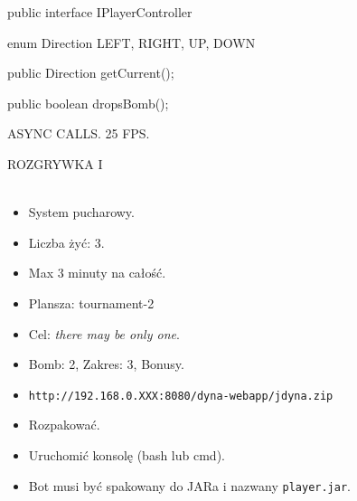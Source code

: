\documentclass[compress]{beamer}
\begin{document}
\begin{frame}
    \begin{javablock}[numbers=none]
public interface IPlayerController
{
    enum Direction
    {
        LEFT, RIGHT, UP, DOWN
    }

    public Direction getCurrent();

    public boolean dropsBomb();
}
    \end{javablock}
    
    \bigskip
    \begin{center}
    ASYNC CALLS. 25 FPS. 
    \end{center}
\end{frame}

\begin{frame}[plain]
\end{frame}

\begin{frame}[plain]
    \begin{center}
    ROZGRYWKA I\\[1cm]
    \\[1cm]
    \end{center}
\end{frame}

\begin{frame}[plain]
    
    \bigskip
    \begin{itemize}
        \item System pucharowy.
        \item Liczba żyć: 3.
        \item Max 3 minuty na całość.
        \item Plansza: tournament-2
        \item Cel: \emph{there may be only one}.

        \bigskip\color{gray}
        \item Bomb: 2, Zakres: 3, Bonusy. 
    \end{itemize}
\end{frame}

\begin{frame}
    \begin{itemize}
        \item \texttt{http://192.168.0.XXX:8080/dyna-webapp/jdyna.zip}
        \item Rozpakować.
        \item Uruchomić konsolę (bash lub cmd).
        \item Bot musi być spakowany do JARa i nazwany \texttt{player.jar}.
    \end{itemize}
\end{frame}
\end{document}
